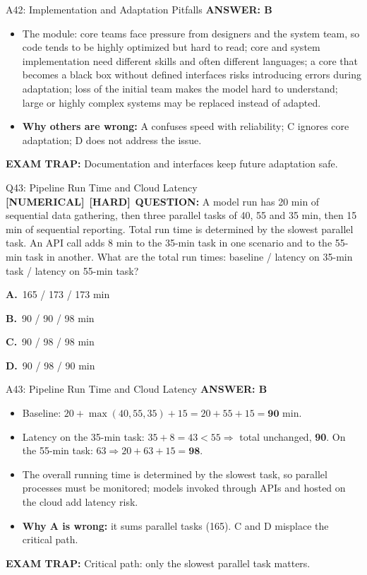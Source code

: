 \documentclass[8pt]{beamer}
\newcommand{\fs}{\fontsize{10}{12}\selectfont}
\newcommand{\opts}[4]{\par\vspace{0.12cm}\noindent\textbf{A.}~#1\par\vspace{0.08cm}\noindent\textbf{B.}~#2\par\vspace{0.08cm}\noindent\textbf{C.}~#3\par\vspace{0.08cm}\noindent\textbf{D.}~#4\par}
\newcommand{\ans}[1]{\textcolor{myblue}{\textbf{ANSWER: #1}}}
\newcommand{\trap}[1]{\textcolor{myred}{\textbf{EXAM TRAP:}} #1}
\newcommand{\numtag}{\textcolor{mypurple}{\textbf{[NUMERICAL]}}}
\newcommand{\hard}{\textcolor{myorange}{\textbf{[HARD]}}}
\begin{document}
\begin{frame}[t]{A42: Implementation and Adaptation Pitfalls}
\fs
\ans{B}
\begin{itemize}
\item The module: core teams face pressure from designers and the system team, so code tends to be highly optimized but hard to read; core and system implementation need different skills and often different languages; a core that becomes a black box without defined interfaces risks introducing errors during adaptation; loss of the initial team makes the model hard to understand; large or highly complex systems may be replaced instead of adapted.
\item \textbf{Why others are wrong:} A confuses speed with reliability; C ignores core adaptation; D does not address the issue.
\end{itemize}
\trap{\textcolor{myblue}{Documentation and interfaces} keep future adaptation safe.}
\end{frame}

\begin{frame}[t]{Q43: Pipeline Run Time and Cloud Latency}
\fs
\numtag\ \hard\ \textbf{QUESTION:} A model run has 20 min of sequential data gathering, then three parallel tasks of 40, 55 and 35 min, then 15 min of sequential reporting. Total run time is determined by the slowest parallel task. An API call adds 8 min to the 35-min task in one scenario and to the 55-min task in another. What are the total run times: baseline / latency on 35-min task / latency on 55-min task?
\opts{165 / 173 / 173 min}
{90 / 90 / 98 min}
{90 / 98 / 98 min}
{90 / 98 / 90 min}
\end{frame}

\begin{frame}[t]{A43: Pipeline Run Time and Cloud Latency}
\fs
\ans{B}
\begin{itemize}
\item Baseline: $20+\max(40,55,35)+15=20+55+15=\mathbf{90}$ min.
\item Latency on the 35-min task: $35+8=43<55\Rightarrow$ total unchanged, \textbf{90}. On the 55-min task: $63\Rightarrow20+63+15=\mathbf{98}$.
\item The overall running time is determined by the slowest task, so parallel processes must be monitored; models invoked through APIs and hosted on the cloud add latency risk.
\item \textbf{Why A is wrong:} it sums parallel tasks (165). C and D misplace the critical path.
\end{itemize}
\trap{Critical path: only the \textcolor{myblue}{slowest} parallel task matters.}
\end{frame}
\end{document}
